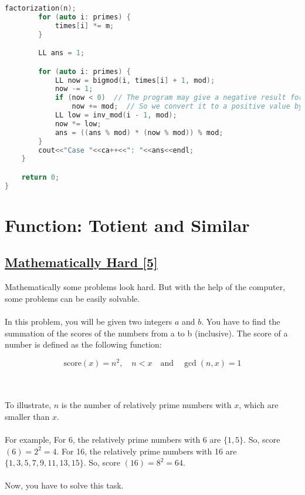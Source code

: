 \documentclass[10pt,a4paper]{article}
\begin{document}
\begin{itemize}
\begin{lstlisting}[language=C++, caption={Efficient Pseudo Code}, label={1st:code}, mathescape=true, breaklines=true]
        factorization(n);
        for (auto i: primes) {
            times[i] *= m;
        }

        LL ans = 1;

        for (auto i: primes) {
            LL now = bigmod(i, times[i] + 1, mod);
            now -= 1;
            if (now < 0)  // The program may give a negative result for modulo of negative numbers
                now += mod;  // So we convert it to a positive value by adding mod
            LL low = inv_mod(i - 1, mod);
            now *= low;
            ans = ((ans % mod) * (now % mod)) % mod;
        }
        cout<<"Case "<<ca++<<": "<<ans<<endl;
    }

    return 0;
}

\end{lstlisting}


\section{Function: Totient and Similar}
\subsection*{\href{https://lightoj.com/problem/mathematically-hard}{\underline{Mathematically Hard [5]}}}
Mathematically some problems look hard. But with the help of the computer, some problems can be easily solvable.
\\ \\
In this problem, you will be given two integers $a$ and $b$. You have to find the summation of the scores of the numbers from a to b (inclusive). The score of a number is defined as the following function:



\[
\text{score}(x) = n^2, \quad n < x \quad \text{and} \quad \gcd(n, x) = 1
\]



\\ \\
To illustrate, $n$ is the number of relatively prime numbers with $x$, which are smaller than $x$.
\\ \\
For example, For 6, the relatively prime numbers with 6 are $\{1, 5\}$. So, score $(6) = 2^2 = 4$. For 16, the relatively prime numbers with 16 are $\{1, 3, 5, 7, 9, 11, 13, 15\}$. So, score $(16) = 8^2 = 64$.
\\ \\
Now, you have to solve this task.


\end{itemize}
\end{document}
